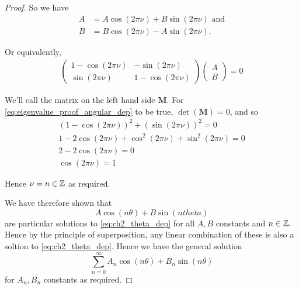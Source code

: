 \begin{proof}
  So we have
  \begin{align*}
    A &= A\cos(2\pi\nu) + B\sin(2\pi\nu) \text{ and}\\
    B &= B\cos(2\pi\nu) - A\sin(2\pi\nu).
  \end{align*}\par
  Or equivalently,
  \begin{align}\label{eq:eigenvalue_proof_angular_dep}
    \begin{pmatrix}
      1 - \cos(2\pi\nu) & -\sin(2\pi\nu)\\
      \sin(2\pi\nu) & 1 - \cos(2\pi\nu)
    \end{pmatrix}
    \begin{pmatrix}
      A\\
      B
    \end{pmatrix}
    = 0
  \end{align}\par
  We'll call the matrix on the left hand side $\mathbf{M}$. For \eqref{eq:eigenvalue_proof_angular_dep} to be true, $\det(\mathbf{M}) = 0$, and so
  \begin{gather*}
    (1 - \cos(2\pi\nu))^2 + (\sin(2\pi\nu))^2 = 0 \\
    1 - 2\cos(2\pi\nu) + \cos^2(2\pi\nu) + \sin^2(2\pi\nu) = 0 \\
    2 - 2\cos(2\pi\nu) = 0 \\
    \cos(2\pi\nu) = 1
  \end{gather*}\par
  Hence $\nu = n \in \mathbb{Z}$ as required. \par
  We have therefore shown that
  \begin{equation}
    A \cos(n\theta) + B \sin(n theta)
  \end{equation}
  are particular solutions to \eqref{eq:ch2_theta_dep} for all $A, B$ constants and $n \in \mathbb{Z}.$ Hence by the principle of superposition, any linear combination of these is also a soltion to \eqref{eq:ch2_theta_dep}. Hence we have the general solution
  \begin{equation*}
    \sum_{n=0}^\infty A_n \cos(n\theta) + B_n \sin(n \theta)
  \end{equation*}
  for $A_n, B_n$ constants as required.
\end{proof}

